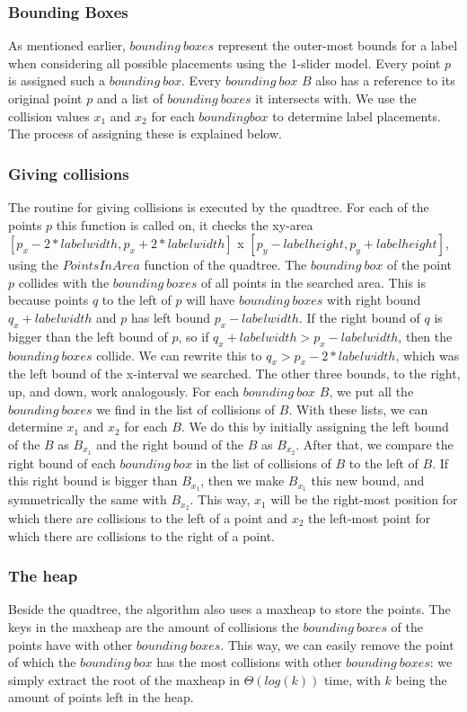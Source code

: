 \documentclass[crop=false,a4paper,oneside,11pt]{article}
\begin{document}
\subsubsection{Bounding Boxes}
As mentioned earlier, $bounding \ boxes$ represent the outer-most bounds for a label when considering all possible placements using the 1-slider model. Every point $p$ is assigned such a $bounding \ box$. Every $bounding \ box$ $B$ also has a reference to its original point $p$ and a list of $bounding \ boxes$ it intersects with. We use the collision values $x_1$ and $x_2$ for each $bounding box$ to determine label placements. The process of assigning these is explained below.

\subsubsection{Giving collisions}
The routine for giving collisions is executed by the quadtree. For each of the points $p$ this function is called on, it checks the xy-area $[p_x - 2*labelwidth, p_x + 2*labelwidth]$ x $[p_y - labelheight, p_y + labelheight]$, using the $PointsInArea$ function of the quadtree. The $bounding \ box$ of the point $p$ collides with the $bounding \ boxes$ of all points in the searched area. This is because points $q$ to the left of $p$ will have $bounding \ boxes$ with right bound $q_x + labelwidth$ and $p$ has left bound $p_x - labelwidth$. If the right bound of $q$ is bigger than the left bound of $p$, so if $q_x + labelwidth > p_x - labelwidth$, then the $bounding \ boxes$ collide. We can rewrite this to $q_x > p_x - 2*labelwidth$, which was the left bound of the x-interval we searched. The other three bounds, to the right, up, and down, work analogously. For each $bounding \ box$ $B$, we put all the $bounding \ boxes$ we find in the list of collisions of $B$. With these lists, we can determine $x_1$ and $x_2$ for each $B$. We do this by initially assigning the left bound of the $B$ as $B_{x_1}$ and the right bound of the $B$ as $B_{x_2}$. After that, we compare the right bound of each $bounding \ box$ in the list of collisions of $B$ to the left of $B$. If this right bound is bigger than $B_{x_1}$, then we make $B_{x_1}$ this new bound, and symmetrically the same with $B_{x_2}$. This way, $x_1$ will be the right-most position for which there are collisions to the left of a point and $x_2$ the left-most point for which there are collisions to the right of a point.

\subsubsection{The heap}
Beside the quadtree, the algorithm also uses a maxheap to store the points. The keys in the maxheap are the amount of collisions the $bounding \ boxes$ of the points have with other $bounding \ boxes$. This way, we can easily remove the point of which the $bounding \ box$ has the most collisions with other $bounding \ boxes$: we simply extract the root of the maxheap in $\Theta(log (k))$ time, with $k$ being the amount of points left in the heap. 
\end{document}
